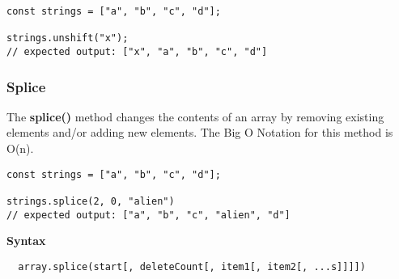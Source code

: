 \begin{lstlisting}
const strings = ["a", "b", "c", "d"];

strings.unshift("x");
// expected output: ["x", "a", "b", "c", "d"]
\end{lstlisting}

\subsubsection{Splice}
The \textbf{splice()} method changes the contents of an array by removing existing elements and/or adding new elements. The Big O Notation for this method is O(n).

\begin{lstlisting}
const strings = ["a", "b", "c", "d"];

strings.splice(2, 0, "alien")
// expected output: ["a", "b", "c", "alien", "d"]
\end{lstlisting}

\textbf{Syntax}
\begin{lstlisting}
  array.splice(start[, deleteCount[, item1[, item2[, ...s]]]])
\end{lstlisting}

\newpage
